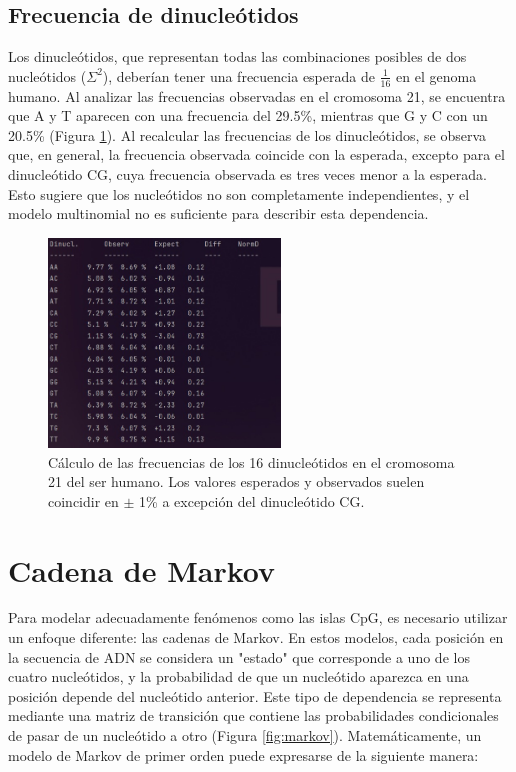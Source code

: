 \subsection{Frecuencia de dinucleótidos}
Los dinucleótidos, que representan todas las combinaciones posibles de dos nucleótidos ($\Sigma^2$), deberían tener una frecuencia esperada de $\frac{1}{16}$ en el genoma humano. Al analizar las frecuencias observadas en el cromosoma 21, se encuentra que A y T aparecen con una frecuencia del 29.5\%, mientras que G y C con un 20.5\% (Figura \ref{fig:dinucleotidos}). Al recalcular las frecuencias de los dinucleótidos, se observa que, en general, la frecuencia observada coincide con la esperada, excepto para el dinucleótido CG, cuya frecuencia observada es tres veces menor a la esperada. Esto sugiere que los nucleótidos no son completamente independientes, y el modelo multinomial no es suficiente para describir esta dependencia.

\begin{figure}[htbp]
\centering
\includegraphics[width = 0.55\textwidth]{figs/freqs-dinucleotidos.jpg}
\caption{Cálculo de las frecuencias de los 16 dinucleótidos en el cromosoma 21 del ser humano. Los valores esperados y observados suelen coincidir en $\pm$ 1\% a excepción del dinucleótido CG. }
\label{fig:dinucleotidos}
\end{figure}
 
\section{Cadena de Markov}
Para modelar adecuadamente fenómenos como las islas CpG, es necesario utilizar un enfoque diferente: las cadenas de Markov. En estos modelos, cada posición en la secuencia de ADN se considera un "estado" que corresponde a uno de los cuatro nucleótidos, y la probabilidad de que un nucleótido aparezca en una posición depende del nucleótido anterior. Este tipo de dependencia se representa mediante una matriz de transición que contiene las probabilidades condicionales de pasar de un nucleótido a otro (Figura \ref{fig:markov}). Matemáticamente, un modelo de Markov de primer orden puede expresarse de la siguiente manera:

